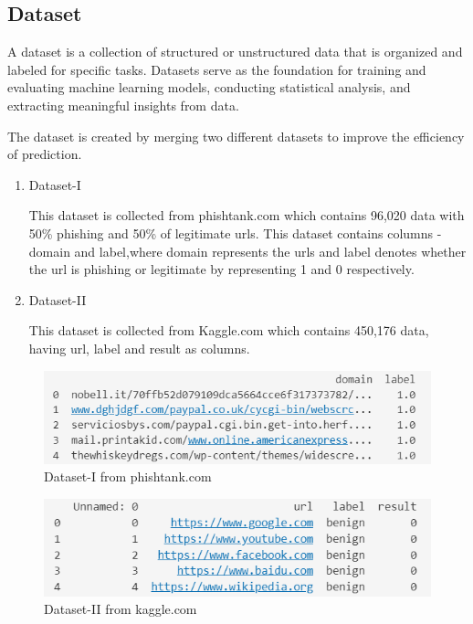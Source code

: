 \subsection{Dataset}
\par  A dataset is a collection of structured or unstructured data that is organized and labeled for specific tasks. Datasets serve as the foundation for training and evaluating machine learning models, conducting statistical analysis, and extracting meaningful insights from data.
\par The dataset is created by merging two different datasets to improve the efficiency of prediction.
\begin{enumerate}
    \item Dataset-I
\par This dataset is collected from phishtank.com which contains 96,020 data with 50\% phishing and 50\% of legitimate urls. This dataset contains columns - domain and label,where domain represents the urls and label denotes whether the url is phishing or legitimate by representing 1 and 0 respectively.
    
    \item Dataset-II
\par This dataset is collected from Kaggle.com which contains 450,176 data, having url, label and result as columns.
\end{enumerate}
\begin{figure}[H]
\centerline{\includegraphics[scale=0.8]{dataset1.png}}
\caption{Dataset-I from phishtank.com}
\label{fig}
\end{figure}
\begin{figure}[H]
\centerline{\includegraphics[scale=0.8]{dataset2.png}}
\caption{Dataset-II from kaggle.com}
\label{fig}
\end{figure}

